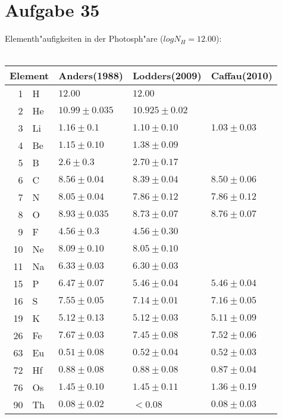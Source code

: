 \section{Aufgabe 35}
Elementh"aufigkeiten in der Photosph"are (\(log N_H=12.00\)):\\\\
\begin{tabular}{r l| l l l}
\multicolumn{2}{l}{Element} & Anders(1988)\footnotemark & Lodders(2009)\footnotemark & Caffau(2010)\footnotemark\\
\hline
1 & H & \(12.00\) & \(12.00\)\\
2 & He & \(10.99\pm 0.035\) & \(10.925\pm 0.02\)\\
3 & Li & \(1.16\pm 0.1\) & \(1.10\pm 0.10\) & \(1.03\pm 0.03\)\\
4 & Be & \(1.15\pm 0.10\) & \(1.38\pm 0.09\)\\
5 & B & \(2.6\pm 0.3\) & \(2.70\pm 0.17\)\\
6 & C & \(8.56\pm 0.04\) & \(8.39\pm 0.04\) & \(8.50\pm 0.06\)\\
7 & N & \(8.05\pm 0.04\) & \(7.86\pm 0.12\) & \(7.86\pm 0.12\)\\
8 & O & \(8.93\pm 0.035\) & \(8.73\pm 0.07\) & \(8.76\pm 0.07\)\\
9 & F & \(4.56\pm 0.3\) & \(4.56\pm 0.30\)\\
10 & Ne & \(8.09\pm 0.10\) & \(8.05\pm 0.10\)\\
11 & Na & \(6.33\pm 0.03\) & \(6.30\pm 0.03\)\\
15 & P & \(6.47\pm 0.07\) & \(5.46\pm 0.04\) & \(5.46\pm 0.04\)\\
16 & S & \(7.55\pm 0.05\) & \(7.14\pm 0.01\) & \(7.16\pm 0.05\)\\
19 & K & \(5.12\pm 0.13\) & \(5.12\pm 0.03\) & \(5.11\pm 0.09\)\\
26 & Fe & \(7.67\pm 0.03\) & \(7.45\pm 0.08\) & \(7.52\pm 0.06\)\\
63 & Eu & \(0.51\pm 0.08\) & \(0.52\pm 0.04\) & \(0.52\pm 0.03\)\\
72 & Hf & \(0.88\pm 0.08\) & \(0.88\pm 0.08\) & \(0.87\pm 0.04\)\\
76 & Os & \(1.45\pm 0.10\) & \(1.45\pm 0.11\) & \(1.36\pm 0.19\)\\
90 & Th & \(0.08\pm 0.02\) & \(< 0.08\) & \(0.08\pm 0.03\)\\
\end{tabular}\\

